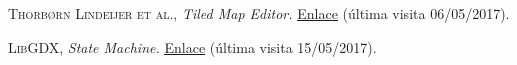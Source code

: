 \begin{thebibliography}{aaaa}
 \textsc{Thorbørn Lindeijer et al.},
\textit{Tiled Map Editor.} \href{http://www.mapeditor.org/}{\color{blue}\underline{Enlace}} (última visita 06/05/2017).

 \textsc{LibGDX},
\textit{State Machine.} \href{https://github.com/libgdx/gdx-ai/wiki/State-Machine}{\color{blue}\underline{Enlace}} (última visita 15/05/2017).
\end{thebibliography}